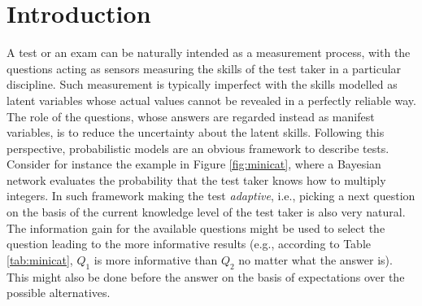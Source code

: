 \documentclass[runningheads]{llncs}
\begin{document}
\section{Introduction}\label{sec:intro}
A test or an exam can be naturally intended as a measurement process, with the questions acting as sensors measuring the skills of the test taker in a particular discipline. Such measurement is typically imperfect with the skills modelled as latent variables whose actual values cannot be revealed in a perfectly reliable way. The role of the questions, whose answers are regarded instead as manifest variables, is to reduce the uncertainty about the latent skills. Following this perspective, probabilistic models are an obvious framework to describe tests. Consider for instance the example in Figure \ref{fig:minicat}, where a Bayesian network evaluates the probability that the test taker knows how to multiply integers. In such framework making the test \emph{adaptive}, i.e., picking a next question on the basis of the current knowledge level of the test taker is also very natural. The information gain for the available questions might be used to select the question leading to the more informative results (e.g., according to Table \ref{tab:minicat}, $Q_1$ is more informative than $Q_2$ no matter what the answer is). This might also be done before the answer on the basis of expectations over the possible alternatives.
\end{document}
